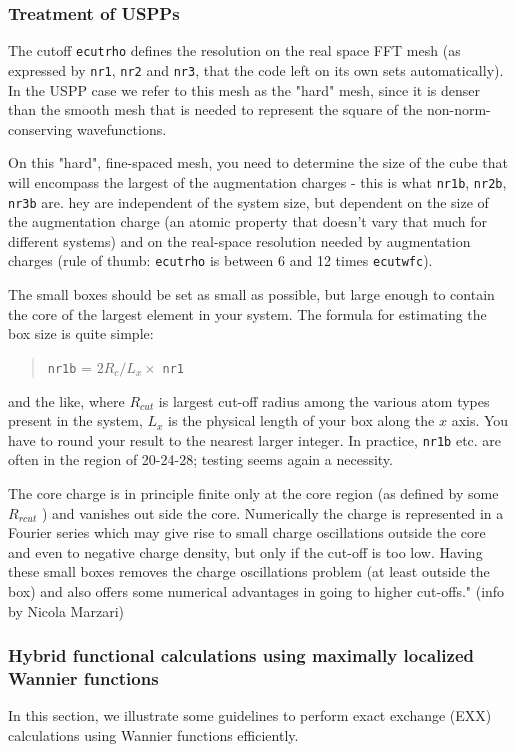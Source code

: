 \documentclass[12pt,a4paper]{article}
\begin{document}
\subsubsection{Treatment of USPPs}

The cutoff \texttt{ecutrho} defines the resolution on the real space FFT mesh (as expressed 
by \texttt{nr1}, \texttt{nr2} and \texttt{nr3}, that the code left on its own sets automatically).
In the USPP case we refer to this mesh as the "hard" mesh, since it 
is denser than the smooth mesh that is needed to represent the square 
of the non-norm-conserving wavefunctions.
  
On this "hard", fine-spaced mesh, you need to determine the size of the
cube that will encompass the largest of the augmentation charges - this
is what \texttt{nr1b}, \texttt{nr2b}, \texttt{nr3b} are. hey are independent 
of the system size, but dependent on the size
of the augmentation charge (an atomic property that doesn't vary 
that much for different systems) and on the
real-space resolution needed by augmentation charges (rule of thumb:
\texttt{ecutrho} is between 6 and 12 times \texttt{ecutwfc}).

The small boxes should be set as small as possible, but large enough
to contain the core of the largest element in your system.
The formula for estimating the box size is quite simple: 
\begin{quote}
   \texttt{nr1b} = $2 R_c / L_x \times$ \texttt{nr1}
\end{quote}
and the like, where $R_{cut}$ is largest cut-off radius among the various atom
types present in the system, $L_x$ is the
physical length of your box along the $x$ axis. You have to round your
result to the nearest larger integer.
In practice, \texttt{nr1b} etc. are often in the region of 20-24-28; testing seems
again a necessity.

The core charge is in principle finite only at the core region (as defined
by some $R_{rcut}$ ) and vanishes out side the core. Numerically the charge is
represented in a Fourier series which may give rise to small charge
oscillations outside the core and even to negative charge density, but
only if the cut-off is too low. Having these small boxes removes the
charge oscillations problem (at least outside the box) and also offers
some numerical advantages in going to higher cut-offs." (info by Nicola Marzari)

\subsubsection{Hybrid functional calculations using maximally localized Wannier functions}
In this section, we illustrate some guidelines to perform exact exchange (EXX) calculations using Wannier functions efficiently. 
\end{document}
